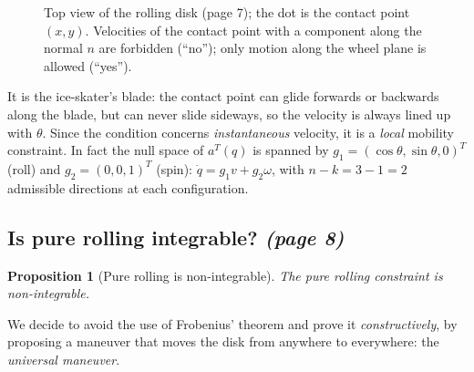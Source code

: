 \documentclass[11pt,a4paper]{article}
\theoremstyle{definition}
\theoremstyle{plain}
\newtheorem{proposition}[definition]{Proposition}
\begin{document}
\begin{figure}[H]
\centering
{}
\caption{Top view of the rolling disk (page 7); the dot is the contact point $(x,y)$. Velocities of the contact point with a component along the normal $n$ are forbidden (``no''); only motion along the wheel plane is allowed (``yes'').}
\end{figure}
 
\begin{intuition}
It is the ice-skater's blade: the contact point can glide forwards or backwards along the blade, but can never slide sideways, so the velocity is always lined up with $\theta$. Since the condition concerns \emph{instantaneous} velocity, it is a \emph{local} mobility constraint. In fact the null space of $a^{T}(q)$ is spanned by $g_1=(\cos\theta,\sin\theta,0)^{T}$ (roll) and $g_2=(0,0,1)^{T}$ (spin): $\dot q=g_1v+g_2\omega$, with $n-k=3-1=2$ admissible directions at each configuration.
\end{intuition}
 
\subsection{Is pure rolling integrable? \emph{(page 8)}}
 
\begin{proposition}[Pure rolling is non-integrable]\label{prop:frobroll}
The pure rolling constraint is non-integrable.
\end{proposition}

 
We decide to avoid the use of Frobenius' theorem and prove it \emph{constructively}, by proposing a maneuver that moves the disk from anywhere to everywhere: the \emph{universal maneuver}.
 
\end{document}

